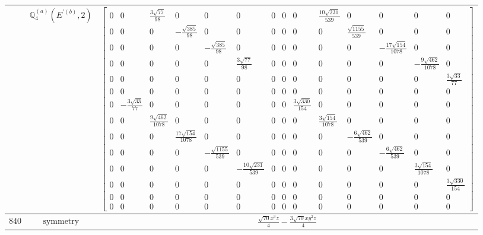 \documentclass[fleqn,8pt,landscape]{jsarticle}
\begin{document}
\begin{longtable}{ccc}
$  $ & $ \mathbb{Q}_{4}^{(a)}(E^{\prime(b)},2) $ & $ \begin{bmatrix} 0 & 0 & \frac{3 \sqrt{77}}{98} & 0 & 0 & 0 & 0 & 0 & 0 & \frac{10 \sqrt{231}}{539} & 0 & 0 & 0 & 0 \\ 0 & 0 & 0 & - \frac{\sqrt{385}}{98} & 0 & 0 & 0 & 0 & 0 & 0 & \frac{\sqrt{1155}}{539} & 0 & 0 & 0 \\ 0 & 0 & 0 & 0 & - \frac{\sqrt{385}}{98} & 0 & 0 & 0 & 0 & 0 & 0 & - \frac{17 \sqrt{154}}{1078} & 0 & 0 \\ 0 & 0 & 0 & 0 & 0 & \frac{3 \sqrt{77}}{98} & 0 & 0 & 0 & 0 & 0 & 0 & - \frac{9 \sqrt{462}}{1078} & 0 \\ 0 & 0 & 0 & 0 & 0 & 0 & 0 & 0 & 0 & 0 & 0 & 0 & 0 & \frac{3 \sqrt{33}}{77} \\ 0 & 0 & 0 & 0 & 0 & 0 & 0 & 0 & 0 & 0 & 0 & 0 & 0 & 0 \\ 0 & - \frac{3 \sqrt{33}}{77} & 0 & 0 & 0 & 0 & 0 & 0 & \frac{3 \sqrt{330}}{154} & 0 & 0 & 0 & 0 & 0 \\ 0 & 0 & \frac{9 \sqrt{462}}{1078} & 0 & 0 & 0 & 0 & 0 & 0 & \frac{3 \sqrt{154}}{1078} & 0 & 0 & 0 & 0 \\ 0 & 0 & 0 & \frac{17 \sqrt{154}}{1078} & 0 & 0 & 0 & 0 & 0 & 0 & - \frac{6 \sqrt{462}}{539} & 0 & 0 & 0 \\ 0 & 0 & 0 & 0 & - \frac{\sqrt{1155}}{539} & 0 & 0 & 0 & 0 & 0 & 0 & - \frac{6 \sqrt{462}}{539} & 0 & 0 \\ 0 & 0 & 0 & 0 & 0 & - \frac{10 \sqrt{231}}{539} & 0 & 0 & 0 & 0 & 0 & 0 & \frac{3 \sqrt{154}}{1078} & 0 \\ 0 & 0 & 0 & 0 & 0 & 0 & 0 & 0 & 0 & 0 & 0 & 0 & 0 & \frac{3 \sqrt{330}}{154} \\ 0 & 0 & 0 & 0 & 0 & 0 & 0 & 0 & 0 & 0 & 0 & 0 & 0 & 0 \\ 0 & 0 & 0 & 0 & 0 & 0 & 0 & 0 & 0 & 0 & 0 & 0 & 0 & 0 \end{bmatrix} $ \\ \hline
$ 840 $ & $ \text{symmetry} $ & $ \frac{\sqrt{70} x^{3} z}{4} - \frac{3 \sqrt{70} x y^{2} z}{4} $ \\

\end{longtable}
\end{document}
